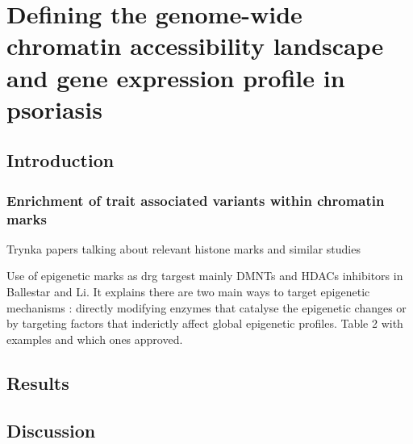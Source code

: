 \chapter{Defining the genome-wide chromatin accessibility landscape and gene expression profile in psoriasis}
\label{ch:Results 2}


\section{Introduction}

\subsection{Enrichment of trait associated variants within chromatin marks }
Trynka papers talking about relevant histone marks and similar studies


Use of epigenetic marks as drg targest mainly DMNTs and HDACs inhibitors in Ballestar and Li. It explains there are two main ways to target epigenetic mechanisms : directly modifying enzymes that catalyse the epigenetic changes  or by targeting factors that inderictly affect global epigenetic profiles. Table 2 with examples and which ones approved.
\section{Results}
%









\section{Discussion}
%






